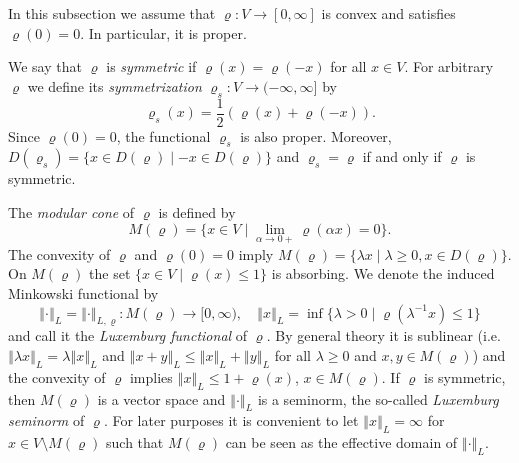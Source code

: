 \documentclass[a4paper,11pt,reqno]{amsart}
\theoremstyle{definition}
\newtheorem{remark}[lemma]{Remark}
\numberwithin{equation}{section}
\newcommand{\R}{{\mathbb R}}
\newcommand{\vr}{{\varrho}}
\newcommand{\av}[1]{\left\Vert #1\right\Vert}
\newcommand{\1}{\mathds{1}}
\begin{document}
In this subsection we assume that $\vr \colon V \to [0,\infty]$ is convex and satisfies $\vr(0) = 0$. In particular, it is proper. 

We say that $\vr$ is {\em symmetric} if $\vr(x) = \vr(-x)$ for all $x \in V$. For arbitrary  $\vr$ we define its {\em symmetrization} $\vr_s \colon V \to (-\infty,\infty]$ by
%
$$\vr_s(x) = \frac{1}{2} \left(\vr(x) + \vr(-x)\right).$$
%
 Since $\vr(0) = 0$, the functional $\vr_s$ is also proper. Moreover,  $D(\vr_s) = \{x \in D(\vr) \mid  -x \in D(\vr)\}$ and  $\vr_s = \vr$ if and only if $\vr$ is symmetric.  



The {\em modular cone} of $\vr$ is defined by
%
$$M(\vr) = \{x \in V \mid \lim_{\alpha \to 0+} \vr(\alpha x) =  0\}. $$
%
 The convexity of $\vr$ and $\vr(0) = 0$ imply $M(\vr) = \{\lambda x \mid \lambda \geq 0, x\in D(\vr)\}$.   On $M(\vr)$ the set $\{x \in V \mid \vr(x) \leq 1\}$ is absorbing. We denote the induced Minkowski functional by
%
$$\av{\cdot}_L = \av{\cdot}_{L,\vr} \colon M(\vr) \to [0,\infty),\quad \av{x}_L = \inf \{ \lambda > 0 \mid \vr(\lambda^{-1}x) \leq 1 \}$$
%
and call it the {\em Luxemburg functional} of $\vr$. By general theory it is sublinear (i.e. $\av{\lambda x}_L = \lambda \av{x}_L$ and $\av{x+y}_L \leq \av{x}_L + \av{y}_L$ for all $\lambda \geq 0$ and $x,y \in M(\vr)$) and the convexity of $\vr$ implies $\av{x}_L \leq 1 + \vr(x)$, $x \in M(\vr)$. If $\vr$ is symmetric, then $M(\vr)$ is a vector space and $\av{\cdot}_L$ is a seminorm, the so-called {\em Luxemburg seminorm} of $\vr$. For later purposes it is convenient to let $\av{x}_L = \infty$ for $x \in V \setminus M(\vr)$ such that $M(\vr)$ can be seen as the effective domain of $\av{\cdot}_L$. 
\end{document}
